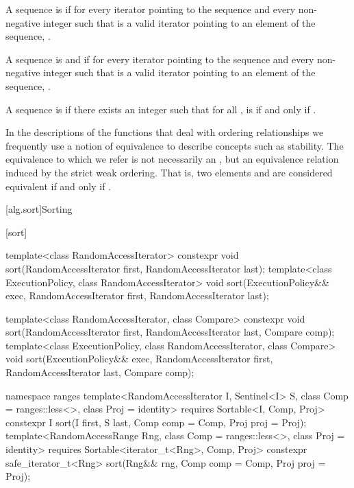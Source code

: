 \pnum
A sequence is
 if for every iterator
pointing to the sequence and every non-negative integer
such that
is a valid iterator pointing to an element of the sequence,
.

\begin{addedblock}
\pnum
A sequence is
 and  if for every iterator
pointing to the sequence and every non-negative integer
such that
is a valid iterator pointing to an element of the sequence,
.
\end{addedblock}

\pnum
A sequence
is
if there exists an integer
such that for all
,
is  if and only if
.

\pnum
In the descriptions of the functions that deal with ordering relationships we frequently use a notion of
equivalence to describe concepts such as stability.
The equivalence to which we refer is not necessarily an
,
but an equivalence relation induced by the strict weak ordering.
That is, two elements
and
are considered equivalent if and only if
.

[alg.sort]{Sorting}

[sort]{}

%
\begin{itemdecl}
template<class RandomAccessIterator>
  constexpr void sort(RandomAccessIterator first, RandomAccessIterator last);
template<class ExecutionPolicy, class RandomAccessIterator>
  void sort(ExecutionPolicy&& exec,
            RandomAccessIterator first, RandomAccessIterator last);

template<class RandomAccessIterator, class Compare>
  constexpr void sort(RandomAccessIterator first, RandomAccessIterator last,
            Compare comp);
template<class ExecutionPolicy, class RandomAccessIterator, class Compare>
  void sort(ExecutionPolicy&& exec,
            RandomAccessIterator first, RandomAccessIterator last,
            Compare comp);
\end{itemdecl}
\begin{addedblock}
\begin{itemdecl}
namespace ranges {
  template<RandomAccessIterator I, Sentinel<I> S, class Comp = ranges::less<>,
      class Proj = identity>
    requires Sortable<I, Comp, Proj>
    constexpr I
      sort(I first, S last, Comp comp = Comp{}, Proj proj = Proj{});
  template<RandomAccessRange Rng, class Comp = ranges::less<>, class Proj = identity>
    requires Sortable<iterator_t<Rng>, Comp, Proj>
    constexpr safe_iterator_t<Rng>
      sort(Rng&& rng, Comp comp = Comp{}, Proj proj = Proj{});
}
\end{itemdecl}
\end{addedblock}

